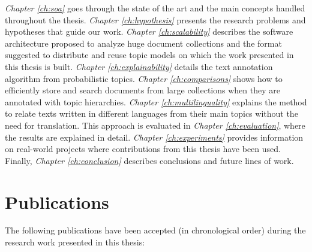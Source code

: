 \textit{Chapter \ref{ch:soa}} goes through the state of the art and the main concepts handled throughout the thesis. \textit{Chapter \ref{ch:hypothesis}} presents the research problems and hypotheses that guide our work. \textit{Chapter \ref{ch:scalability}} describes the software architecture proposed to analyze huge document collections and the format suggested to distribute and reuse topic models on which the work presented in this thesis is built. \textit{Chapter \ref{ch:explainability}} details the text annotation algorithm from probabilistic topics. \textit{Chapter \ref{ch:comparisons}} shows how to efficiently store and search documents from large collections when they are annotated with topic hierarchies.  \textit{Chapter \ref{ch:multilinguality}} explains the method to relate texts written in different languages from their main topics without the need for translation. This approach is evaluated in \textit{Chapter \ref{ch:evaluation}}, where the results are explained in detail. \textit{Chapter \ref{ch:experiments}} provides information on real-world projects where contributions from this thesis have been used. Finally, \textit{Chapter \ref{ch:conclusion}} describes conclusions and future lines of work.


\section{Publications}

The following publications have been accepted (in chronological order) during the research work presented in this thesis:

